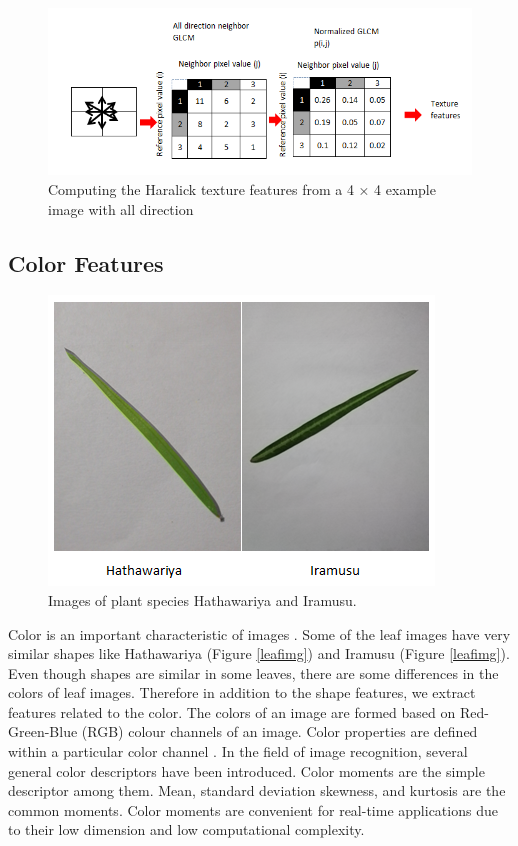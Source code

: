 \documentclass{article}
\begin{document}
\begin{figure}[!ht]

{\centering \includegraphics[width=0.5\linewidth]{leaffeatures/GLMC2.png} 

}

\caption{\label{img2}Computing the Haralick texture features from a 4 × 4 example image with all direction}\label{fig:unnamed-chunk-11}
\end{figure}

\hypertarget{color-features}{%
\subsection{Color Features}\label{color-features}}

\begin{figure}[!ht]

{\centering \includegraphics[width=0.3\linewidth]{leaffeatures/leaf_img.png} 

}

\caption{\label{leafimg} Images of plant species Hathawariya and Iramusu.}\label{fig:unnamed-chunk-12}
\end{figure}

Color is an important characteristic of images \citep{articlee,inproceedings1}. Some of the leaf images have very
similar shapes like Hathawariya (Figure \ref{leafimg}) and Iramusu
(Figure \ref{leafimg}). Even though shapes are similar in some leaves,
there are some differences in the colors of leaf images. Therefore in
addition to the shape features, we extract features related to the
color. The colors of an image are formed based on Red-Green-Blue (RGB)
colour channels of an image. Color properties are defined within a
particular color channel \citep{colarticle1,articlee}. In the field of image recognition, several general
color descriptors have been introduced. Color moments \citep{colarticle1,articlee} are the simple descriptor
among them. Mean, standard deviation skewness, and kurtosis are the
common moments. Color moments are convenient for real-time applications
due to their low dimension and low computational complexity.
\end{document}
